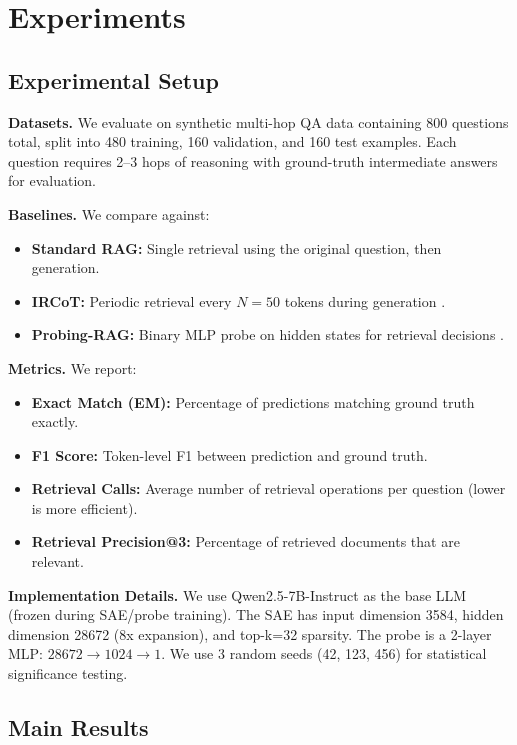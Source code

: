 \documentclass{article}
\begin{document}
\section{Experiments}
\label{sec:experiments}

\subsection{Experimental Setup}

\textbf{Datasets.} We evaluate on synthetic multi-hop QA data containing 800 questions total, split into 480 training, 160 validation, and 160 test examples. Each question requires 2--3 hops of reasoning with ground-truth intermediate answers for evaluation.

\textbf{Baselines.} We compare against:
\begin{itemize}
    \item \textbf{Standard RAG:} Single retrieval using the original question, then generation.
    \item \textbf{IRCoT:} Periodic retrieval every $N=50$ tokens during generation \citep{trivedi2023ircot}.
    \item \textbf{Probing-RAG:} Binary MLP probe on hidden states for retrieval decisions \citep{probingrag2024}.
\end{itemize}

\textbf{Metrics.} We report:
\begin{itemize}
    \item \textbf{Exact Match (EM):} Percentage of predictions matching ground truth exactly.
    \item \textbf{F1 Score:} Token-level F1 between prediction and ground truth.
    \item \textbf{Retrieval Calls:} Average number of retrieval operations per question (lower is more efficient).
    \item \textbf{Retrieval Precision@3:} Percentage of retrieved documents that are relevant.
\end{itemize}

\textbf{Implementation Details.} We use Qwen2.5-7B-Instruct as the base LLM (frozen during SAE/probe training). The SAE has input dimension 3584, hidden dimension 28672 (8x expansion), and top-k=32 sparsity. The probe is a 2-layer MLP: $28672 \rightarrow 1024 \rightarrow 1$. We use 3 random seeds (42, 123, 456) for statistical significance testing.

\subsection{Main Results}
\end{document}
